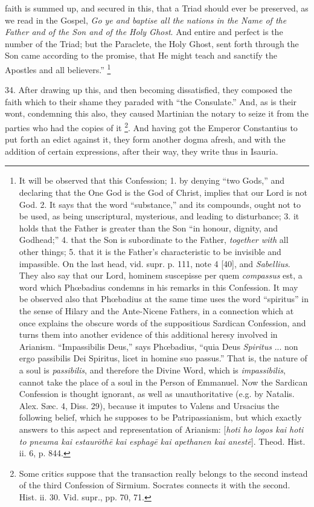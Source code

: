 faith is summed up, and secured in this, that a Triad should ever be
preserved, as we read in the Gospel, \emph{Go ye and baptise all the
nations in the Name of the Father and of the Son and of the Holy Ghost}.
And entire and perfect is the number of the Triad; but the Paraclete,
the Holy Ghost, sent forth through the Son came according to the
promise, that He might teach and sanctify the Apostles and all
believers.'' \footnote{It will be observed that this Confession; 1. by denying ``two Gods,''
and declaring that the One God is the God of Christ, implies that our
Lord is not God. 2. It says that the word ``substance,'' and its
compounds, ought not to be used, as being unscriptural, mysterious,
and leading to disturbance; 3. it holds that the Father is greater
than the Son ``in honour, dignity, and Godhead;'' 4. that the Son is
subordinate to the Father, \emph{together with} all other things; 5.
that it is the Father's characteristic to be invisible and impassible.
On the last head, vid. supr. p. 111, note 4 [40], and \emph{Sabellius}.
They also say that our Lord, hominem suscepisse per quem \emph{compassus}
est, a word which Phœbadius condemns in his remarks in this
Confession. It may be observed also that Phœbadius at the same time
uses the word ``spiritus'' in the sense of Hilary and the Ante-Nicene
Fathers, in a connection which at once explains the obscure words of
the suppositious Sardican Confession, and turns them into another
evidence of this additional heresy involved in Arianism. ``Impassibilis
Deus,'' says Phœbadius, ``quia Deus \emph{Spiritus} ... non ergo
passibilis Dei Spiritus, licet in homine suo passus.'' That is, the
nature of a soul is \emph{passibilis}, and therefore the Divine Word,
which is \emph{impassibilis}, cannot take the place of a soul in the
Person of Emmanuel. Now the Sardican Confession is thought ignorant,
as well as unauthoritative (e.g. by Natalis. Alex. Sæc. 4, Diss. 29),
because it imputes to Valens and Ursacius the following belief, which
he supposes to be Patripassianism, but which exactly answers to this
aspect and representation of Arianism: [\emph{hoti ho logos kai hoti to
pneuma kai estaur\={o}th\={e} kai esphag\={e} kai apethanen
kai anest\={e}}]. Theod. Hist. ii. 6, p. 844.}

34. After drawing up this, and
then becoming dissatisfied, they composed the faith which to their
shame they paraded with ``the Consulate.'' And, as is their wont,
condemning this also, they caused Martinian the notary to seize it
from the parties who had the copies of it \footnote{Some critics suppose that the transaction really belongs to the second
instead of the third Confession of Sirmium. Socrates connects it with
the second. Hist. ii. 30. Vid. supr., pp. 70, 71.}. And having got the Emperor Constantius to put forth an edict
against it, they form another dogma afresh, and with the addition of
certain expressions, after their way, they write thus in Isauria.

